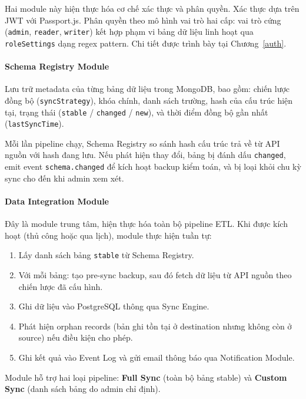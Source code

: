 Hai module này hiện thực hóa cơ chế xác thực và phân quyền. Xác thực
dựa trên JWT với Passport.js. Phân quyền theo mô hình vai trò hai cấp:
vai trò cứng (\texttt{admin}, \texttt{reader}, \texttt{writer}) kết hợp
phạm vi bảng dữ liệu linh hoạt qua \texttt{roleSettings} dạng regex
pattern. Chi tiết được trình bày tại Chương~\ref{auth}.

\paragraph{Schema Registry Module}

Lưu trữ metadata của từng bảng dữ liệu trong MongoDB, bao gồm: chiến
lược đồng bộ (\texttt{syncStrategy}), khóa chính, danh sách trường, hash
của cấu trúc hiện tại, trạng thái (\texttt{stable} / \texttt{changed} /
\texttt{new}), và thời điểm đồng bộ gần nhất (\texttt{lastSyncTime}).

Mỗi lần pipeline chạy, Schema Registry so sánh hash cấu trúc trả về từ
API nguồn với hash đang lưu. Nếu phát hiện thay đổi, bảng bị đánh dấu
\texttt{changed}, emit event \texttt{schema.changed} để kích hoạt backup
kiểm toán, và bị loại khỏi chu kỳ sync cho đến khi admin xem xét.

\paragraph{Data Integration Module}

Đây là module trung tâm, hiện thực hóa toàn bộ pipeline ETL. Khi được
kích hoạt (thủ công hoặc qua lịch), module thực hiện tuần tự:

\begin{enumerate}
    \item Lấy danh sách bảng \texttt{stable} từ Schema Registry.
    \item Với mỗi bảng: tạo pre-sync backup, sau đó fetch dữ liệu từ API
    nguồn theo chiến lược đã cấu hình.
    \item Ghi dữ liệu vào PostgreSQL thông qua Sync Engine.
    \item Phát hiện orphan records (bản ghi tồn tại ở destination nhưng
    không còn ở source) nếu điều kiện cho phép.
    \item Ghi kết quả vào Event Log và gửi email thông báo qua
    Notification Module.
\end{enumerate}

Module hỗ trợ hai loại pipeline: \textbf{Full Sync} (toàn bộ bảng
stable) và \textbf{Custom Sync} (danh sách bảng do admin chỉ định).

